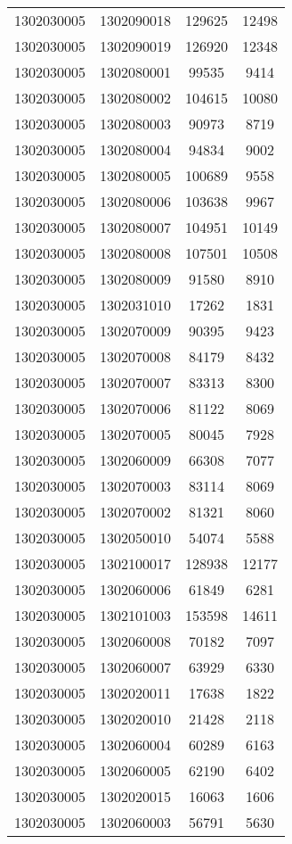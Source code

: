 \begin{longtable}{llcc}
1302030005 & 1302090018 & 129625 & 12498\\
1302030005 & 1302090019 & 126920 & 12348\\
1302030005 & 1302080001 & 99535 & 9414\\
1302030005 & 1302080002 & 104615 & 10080\\
1302030005 & 1302080003 & 90973 & 8719\\
1302030005 & 1302080004 & 94834 & 9002\\
1302030005 & 1302080005 & 100689 & 9558\\
1302030005 & 1302080006 & 103638 & 9967\\
1302030005 & 1302080007 & 104951 & 10149\\
1302030005 & 1302080008 & 107501 & 10508\\
1302030005 & 1302080009 & 91580 & 8910\\
1302030005 & 1302031010 & 17262 & 1831\\
1302030005 & 1302070009 & 90395 & 9423\\
1302030005 & 1302070008 & 84179 & 8432\\
1302030005 & 1302070007 & 83313 & 8300\\
1302030005 & 1302070006 & 81122 & 8069\\
1302030005 & 1302070005 & 80045 & 7928\\
1302030005 & 1302060009 & 66308 & 7077\\
1302030005 & 1302070003 & 83114 & 8069\\
1302030005 & 1302070002 & 81321 & 8060\\
1302030005 & 1302050010 & 54074 & 5588\\
1302030005 & 1302100017 & 128938 & 12177\\
1302030005 & 1302060006 & 61849 & 6281\\
1302030005 & 1302101003 & 153598 & 14611\\
1302030005 & 1302060008 & 70182 & 7097\\
1302030005 & 1302060007 & 63929 & 6330\\
1302030005 & 1302020011 & 17638 & 1822\\
1302030005 & 1302020010 & 21428 & 2118\\
1302030005 & 1302060004 & 60289 & 6163\\
1302030005 & 1302060005 & 62190 & 6402\\
1302030005 & 1302020015 & 16063 & 1606\\
1302030005 & 1302060003 & 56791 & 5630\\

\end{longtable}
